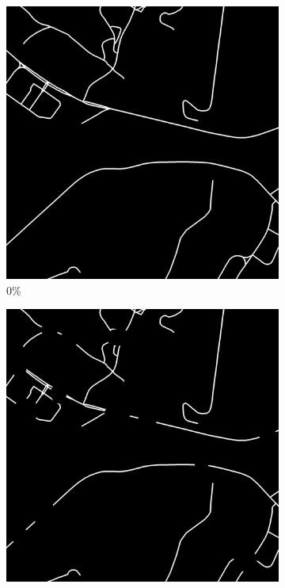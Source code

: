 \begin{figure}[!b]
\begin{subfigure}{0.31\textwidth}
\includegraphics[width=\linewidth]{figs/E8/omission/noise0.png}
\caption{0\%}
\end{subfigure}
\hspace*{\fill} %
\begin{subfigure}{0.31\textwidth}
\includegraphics[width=\linewidth]{figs/E8/omission/noise2.png}

\end{subfigure}
\end{figure}
